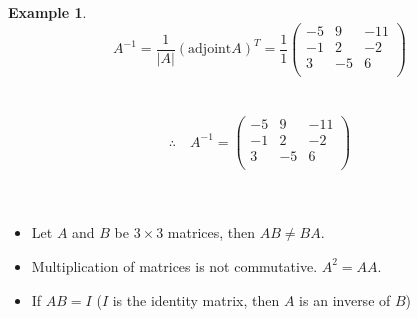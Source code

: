 \documentclass[11pt,a4paper]{article}
\theoremstyle{definition}
\newtheorem{example}[thm]{Example}
\begin{document}
\begin{example}
$$A^{-1}=\frac{1}{|A|}(\text{adjoint} A)^T= \frac{1}{1}
\begin{pmatrix}
-5 & 9 & -11\\
-1 & 2 & -2\\
3 & -5 & 6\\
\end{pmatrix}
$$\\\\

$$\therefore \quad  A^{-1}=
\begin{pmatrix}
-5 & 9 & -11\\
-1 & 2 & -2\\
3 & -5 & 6\\
\end{pmatrix}
$$\\\\

\begin{itemize}
\item Let $A$ and $B$ be $3\times 3$ matrices, then $AB\neq BA$.
\item Multiplication of matrices is not commutative. $A^2=AA$.
\item If $AB=I$ ($I$ is the identity matrix, then $A$ is an inverse of $B$)
\end{itemize}
\end{example}
\end{document}
